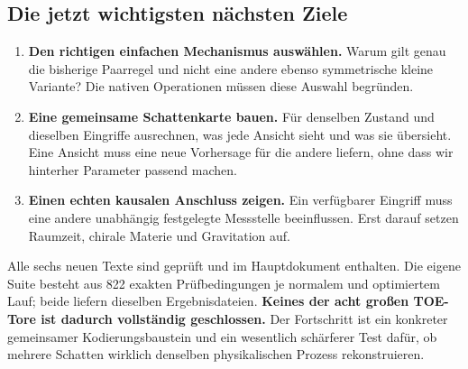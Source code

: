\documentclass[
  ngerman,
  10pt,
  a4paper,
]{article}
\providecommand{\tightlist}{%
  \setlength{\itemsep}{0pt}\setlength{\parskip}{0pt}}
\begin{document}
\subsection{Die jetzt wichtigsten nächsten
Ziele}\label{die-jetzt-wichtigsten-nuxe4chsten-ziele}

\begin{enumerate}
\def\labelenumi{\arabic{enumi}.}
\tightlist
\item
  \textbf{Den richtigen einfachen Mechanismus auswählen.} Warum gilt
  genau die bisherige Paarregel und nicht eine andere ebenso
  symmetrische kleine Variante? Die nativen Operationen müssen diese
  Auswahl begründen.
\item
  \textbf{Eine gemeinsame Schattenkarte bauen.} Für denselben Zustand
  und dieselben Eingriffe ausrechnen, was jede Ansicht sieht und was sie
  übersieht. Eine Ansicht muss eine neue Vorhersage für die andere
  liefern, ohne dass wir hinterher Parameter passend machen.
\item
  \textbf{Einen echten kausalen Anschluss zeigen.} Ein verfügbarer
  Eingriff muss eine andere unabhängig festgelegte Messstelle
  beeinflussen. Erst darauf setzen Raumzeit, chirale Materie und
  Gravitation auf.
\end{enumerate}

Alle sechs neuen Texte sind geprüft und im Hauptdokument enthalten. Die
eigene Suite besteht aus 822 exakten Prüfbedingungen je normalem und
optimiertem Lauf; beide liefern dieselben Ergebnisdateien.
\textbf{Keines der acht großen TOE-Tore ist dadurch vollständig
geschlossen.} Der Fortschritt ist ein konkreter gemeinsamer
Kodierungsbaustein und ein wesentlich schärferer Test dafür, ob mehrere
Schatten wirklich denselben physikalischen Prozess rekonstruieren.
\end{document}
